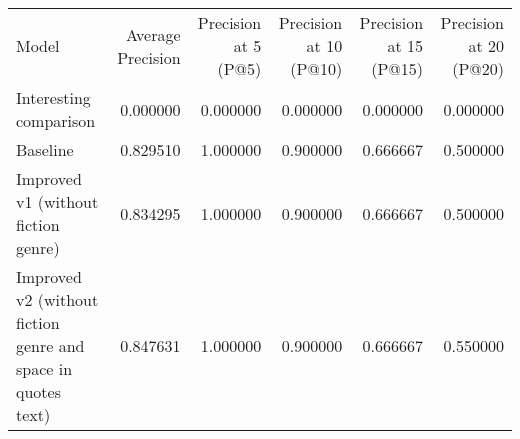 \begin{tabular}{lrrrrr}
Model & Average Precision & Precision at 5 (P@5) & Precision at 10 (P@10) & Precision at 15 (P@15) & Precision at 20 (P@20) \\
Interesting comparison & 0.000000 & 0.000000 & 0.000000 & 0.000000 & 0.000000 \\
Baseline & 0.829510 & 1.000000 & 0.900000 & 0.666667 & 0.500000 \\
Improved v1 (without fiction genre) & 0.834295 & 1.000000 & 0.900000 & 0.666667 & 0.500000 \\
Improved v2 (without fiction genre and space in quotes text) & 0.847631 & 1.000000 & 0.900000 & 0.666667 & 0.550000 \\
\end{tabular}
